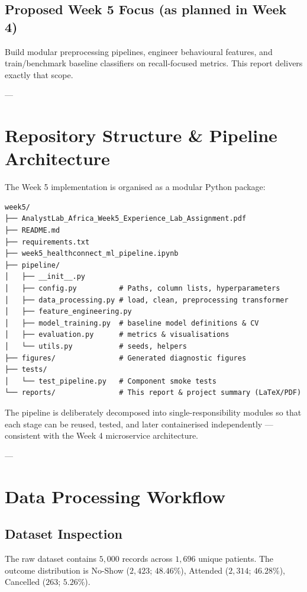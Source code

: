 \documentclass[11pt,a4paper]{article}
\begin{document}
\subsection{Proposed Week 5 Focus (as planned in Week 4)}
Build modular preprocessing pipelines, engineer behavioural features, and train/benchmark baseline
classifiers on recall-focused metrics. This report delivers exactly that scope.

---

\section{Repository Structure \& Pipeline Architecture}
The Week 5 implementation is organised as a modular Python package:

\begin{verbatim}
week5/
├── AnalystLab_Africa_Week5_Experience_Lab_Assignment.pdf
├── README.md
├── requirements.txt
├── week5_healthconnect_ml_pipeline.ipynb
├── pipeline/
│   ├── __init__.py
│   ├── config.py          # Paths, column lists, hyperparameters
│   ├── data_processing.py # load, clean, preprocessing transformer
│   ├── feature_engineering.py
│   ├── model_training.py  # baseline model definitions & CV
│   ├── evaluation.py      # metrics & visualisations
│   └── utils.py           # seeds, helpers
├── figures/               # Generated diagnostic figures
├── tests/
│   └── test_pipeline.py   # Component smoke tests
└── reports/               # This report & project summary (LaTeX/PDF)
\end{verbatim}

The pipeline is deliberately decomposed into single-responsibility modules so that each stage can be
reused, tested, and later containerised independently — consistent with the Week 4 microservice
architecture.

---

\section{Data Processing Workflow}
\subsection{Dataset Inspection}
The raw dataset contains $5,000$ records across $1,696$ unique patients. The outcome distribution is
No-Show ($2,423$; $48.46\%$), Attended ($2,314$; $46.28\%$), Cancelled ($263$; $5.26\%$).
\end{document}

